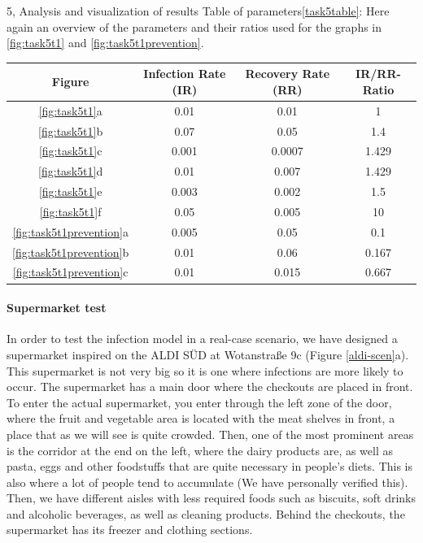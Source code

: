 \begin{task}{5, Analysis and visualization of results}
Table of parameters\ref{task5table}: Here again an overview of the parameters and their ratios used for the graphs in \ref{fig:task5t1} and \ref{fig:task5t1prevention}.
\begin{center}
\begin{tabular}{ |c|c|c|c| } 
 \hline
Figure & Infection Rate (IR) & Recovery Rate (RR) & IR/RR-Ratio\\
\hline
\ref{fig:task5t1}a & 0.01 & 0.01 & 1 \\
\hline
\ref{fig:task5t1}b & 0.07 & 0.05 & 1.4\\
\hline
\ref{fig:task5t1}c & 0.001 & 0.0007 & 1.429\\
\hline
\ref{fig:task5t1}d & 0.01 & 0.007 & 1.429\\
\hline
\ref{fig:task5t1}e & 0.003 & 0.002 & 1.5\\
\hline
\ref{fig:task5t1}f & 0.05 & 0.005 & 10\\
\hline
\ref{fig:task5t1prevention}a & 0.005 & 0.05 & 0.1\\
\hline
\ref{fig:task5t1prevention}b & 0.01 & 0.06 & 0.167\\
\hline
\ref{fig:task5t1prevention}c & 0.01 & 0.015 & 0.667\\
\hline
\end{tabular}
\label{task5table}
\end{center}


\paragraph{Supermarket test}
In order to test the infection model in a real-case scenario, we have designed a supermarket inspired on the ALDI SÜD at Wotanstraße 9c (Figure \ref{aldi-scen}a). This supermarket is not very big so it is one where infections are more likely to occur. The supermarket has a main door where the checkouts are placed in front. To enter the actual supermarket, you enter through the left zone of the door, where the fruit and vegetable area is located with the meat shelves in front, a place that as we will see is quite crowded. Then, one of the most prominent areas is the corridor at the end on the left, where the dairy products are, as well as pasta, eggs and other foodstuffs that are quite necessary in people's diets. This is also where a lot of people tend to accumulate (We have personally verified this).
Then, we have different aisles with less required foods such as biscuits, soft drinks and alcoholic beverages, as well as cleaning products. Behind the checkouts, the supermarket has its freezer and clothing sections.


\end{task}
